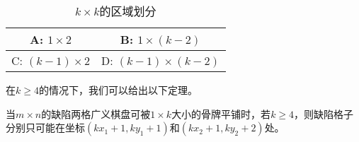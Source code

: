 \begin{table}[htbp]
	\centering
	\caption{$k \times k$的区域划分}
	\begin{tabular}{|c|c|}
		\hline
		A: $1 \times 2$       & B: $1  \times (k - 2)$     \\
		\hline
		C: $(k - 1) \times 2$ & D: $(k - 1)\times (k - 2)$ \\
		\hline
	\end{tabular}
	\label{fig:k-division}
\end{table}

在$k \ge 4$的情况下，我们可以给出以下定理。
\begin{theorem}
	\label{basic-theorem-3}
	当$m \times n$的缺陷两格广义棋盘可被$1 \times k$大小的骨牌平铺时，若$k \ge 4$，则缺陷格子分别只可能在坐标$(kx_1 + 1, ky_1 + 1)$和$(kx_2 + 1, ky_2 + 2)$处。
\end{theorem}
